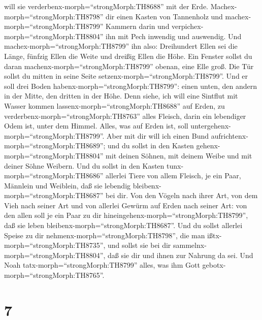 will sie verderbenx-morph=``strongMorph:TH8688'' mit der Erde.
 Machex-morph=``strongMorph:TH8798'' dir einen Kasten von
Tannenholz und machex-morph=``strongMorph:TH8799'' Kammern darin und
verpichex-morph=``strongMorph:TH8804'' ihn mit Pech inwendig und
auswendig.  Und machex-morph=``strongMorph:TH8799'' ihn
also: Dreihundert Ellen sei die Länge, fünfzig Ellen die Weite und
dreißig Ellen die Höhe.  Ein Fenster sollst du daran
machenx-morph=``strongMorph:TH8799'' obenan, eine Elle groß. Die Tür
sollst du mitten in seine Seite setzenx-morph=``strongMorph:TH8799''.
Und er soll drei Boden habenx-morph=``strongMorph:TH8799'': einen unten,
den andern in der Mitte, den dritten in der Höhe.  Denn
siehe, ich will eine Sintflut mit Wasser kommen
lassenx-morph=``strongMorph:TH8688'' auf Erden, zu
verderbenx-morph=``strongMorph:TH8763'' alles Fleisch, darin ein
lebendiger Odem ist, unter dem Himmel. Alles, was auf Erden ist, soll
untergehenx-morph=``strongMorph:TH8799''.  Aber mit dir
will ich einen Bund aufrichtenx-morph=``strongMorph:TH8689''; und du
sollst in den Kasten gehenx-morph=``strongMorph:TH8804'' mit deinen
Söhnen, mit deinem Weibe und mit deiner Söhne Weibern.  Und
du sollst in den Kasten tunx-morph=``strongMorph:TH8686'' allerlei Tiere
von allem Fleisch, je ein Paar, Männlein und Weiblein, daß sie lebendig
bleibenx-morph=``strongMorph:TH8687'' bei dir.  Von den
Vögeln nach ihrer Art, von dem Vieh nach seiner Art und von allerlei
Gewürm auf Erden nach seiner Art: von den allen soll je ein Paar zu dir
hineingehenx-morph=``strongMorph:TH8799'', daß sie leben
bleibenx-morph=``strongMorph:TH8687''.  Und du sollst
allerlei Speise zu dir nehmenx-morph=``strongMorph:TH8798'', die man
ißtx-morph=``strongMorph:TH8735'', und sollst sie bei dir
sammelnx-morph=``strongMorph:TH8804'', daß sie dir und ihnen zur Nahrung
da sei.  Und Noah tatx-morph=``strongMorph:TH8799'' alles,
was ihm Gott gebotx-morph=``strongMorph:TH8765''.

\hypertarget{section-6}{%
\section{7}\label{section-6}}

